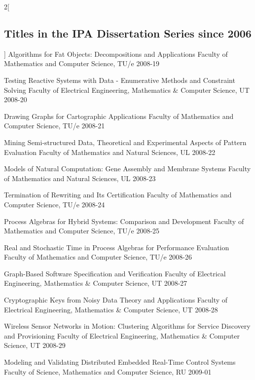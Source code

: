 \begin{multicols}{2}[\subsection*{Titles in the IPA Dissertation Series since 2006}]
         {Algorithms for Fat Objects: Decompositions and Applications}
         {Faculty of Mathematics and Computer Science, TU/e}
         {2008-19}

         {Testing Reactive Systems with Data - Enumerative Methods and Constraint Solving}
         {Faculty of Electrical Engineering, Mathematics \& Computer Science, UT}
         {2008-20}

         {Drawing Graphs for Cartographic Applications}
         {Faculty of Mathematics and Computer Science, TU/e}
         {2008-21}

         {Mining Semi-structured Data, Theoretical and Experimental Aspects of Pattern Evaluation}
         {Faculty of Mathematics and Natural Sciences, UL}
         {2008-22}

         {Models of Natural Computation: Gene Assembly and Membrane Systems}
         {Faculty of Mathematics and Natural Sciences, UL}
         {2008-23}

         {Termination of Rewriting and Its Certification}
         {Faculty of Mathematics and Computer Science, TU/e}
         {2008-24}

         {Process Algebras for Hybrid Systems: Comparison and Development}
         {Faculty of Mathematics and Computer Science, TU/e}
         {2008-25}

         {Real and Stochastic Time in Process Algebras for Performance Evaluation}
         {Faculty of Mathematics and Computer Science, TU/e}
         {2008-26}


         {Graph-Based Software Specification and Verification}
         {Faculty of Electrical Engineering, Mathematics \& Computer Science, UT}
         {2008-27}

         {Cryptographic Keys from Noisy Data Theory and Applications}
         {Faculty of Electrical Engineering, Mathematics \& Computer Science, UT}
         {2008-28}

         {Wireless Sensor Networks in Motion: Clustering Algorithms for Service Discovery and Provisioning}
         {Faculty of Electrical Engineering, Mathematics \& Computer Science, UT}
         {2008-29}


         {Modeling and Validating Distributed Embedded Real-Time Control Systems}
         {Faculty of Science, Mathematics and Computer Science, RU}
         {2009-01}


\end{multicols}
